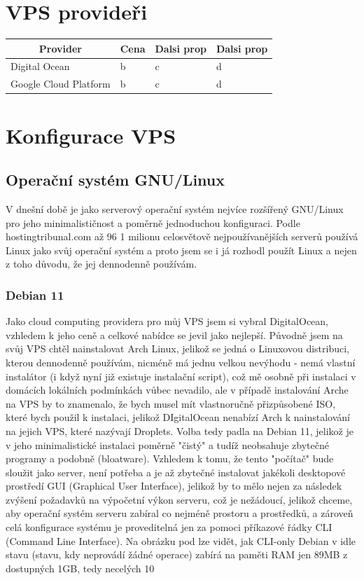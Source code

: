 \documentclass[12pt,a4paper]{report}
\begin{document}
  \section{VPS provideři}
  
  \begin{center}
    \begin{tabular}{|l|l|l|l|}
      \multicolumn{1}{c}{\bfseries Provider} & \multicolumn{1}{c}{\bfseries Cena} & \multicolumn{1}{c}{\bfseries Dalsi prop} & \multicolumn{1}{c}{\bfseries Dalsi prop} \\ \hline
      Digital Ocean & b & c & d \\ \hline
      Google Cloud Platform & b & c & d \\ \hline
      \end{tabular}
  \end{center}

  \section{Konfigurace VPS}
  \subsection{Operační systém GNU/Linux}
  V dnešní době je jako serverový operační systém nejvíce rozšířený GNU/Linux pro jeho
  minimalističnost a poměrně jednoduchou konfiguraci. Podle hostingtribunal.com až 96%
  1 milionu celosvětově nejpoužívanějších serverů používá Linux jako svůj operační systém a proto
  jsem se i já rozhodl použít Linux a nejen z toho důvodu, že jej dennodenně používám.
  \subsubsection{Debian 11}
  Jako cloud computing providera pro můj VPS jsem si vybral DigitalOcean, vzhledem k jeho ceně a
  celkové nabídce se jevil jako nejlepší. Původně jsem na svůj VPS chtěl nainstalovat Arch Linux,
  jelikož se jedná o Linuxovou distribuci, kterou dennodenně používám, nicméně má jednu velkou
  nevýhodu - nemá vlastní instalátor (i když nyní již existuje instalační script), což mě osobně při
  instalaci v domácích lokálních podmínkách vůbec nevadilo, ale v případě instalování Arche na VPS
  by to znamenalo, že bych musel mít vlastnoručně přizpůsobené ISO, které bych použil k instalaci,
  jelikož DIgitalOcean nenabízí Arch k nainstalování na jejich VPS, které nazývají Droplets.
  Volba tedy padla na Debian 11, jelikož je v jeho minimalistické instalaci poměrně "čistý" a tudíž
  neobsahuje zbytečné programy a podobně (bloatware). Vzhledem k tomu, že tento "počítač" bude
  sloužit jako server, není potřeba a je až zbytečné instalovat jakékoli desktopové prostředí GUI
  (Graphical User Interface), jelikož by to mělo nejen za následek zvýšení požadavků na výpočetní
  výkon serveru, což je nežádoucí, jelikož chceme, aby operační systém serveru zabíral co nejméně
  prostoru a prostředků, a zároveň celá konfigurace systému je proveditelná jen za pomoci
  příkazové řádky CLI (Command Line Interface). Na obrázku pod lze vidět, jak CLI-only Debian v idle
  stavu (stavu, kdy neprovádí žádné operace) zabírá na paměti RAM jen 89MB z dostupných 1GB,
  tedy necelých 10%
\end{document}
